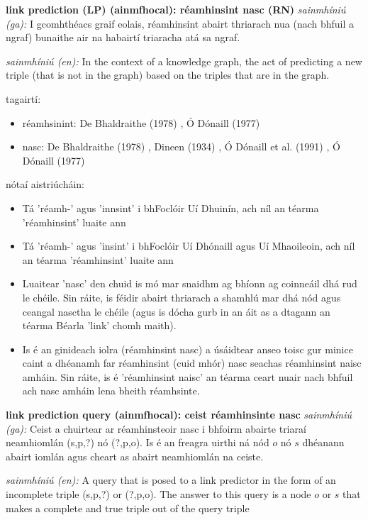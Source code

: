 \documentclass{article}
\begin{document}
\textbf{link prediction (LP) (ainmfhocal): réamhinsint nasc (RN)}
\textit{sainmhíniú (ga):} I gcomhthéacs graif eolais, réamhinsint abairt thriarach nua (nach bhfuil a ngraf) bunaithe air na habairtí triaracha atá sa ngraf.

\textit{sainmhíniú (en):} In the context of a knowledge graph, the act of predicting a new triple (that is not in the graph) based on the triples that are in the graph.

tagairtí:
\begin{itemize}
	\item réamhsinint: De Bhaldraithe (1978) \cite{de-bhaldraithe}, Ó Dónaill (1977) \cite{odonaill}
	\item nasc: De Bhaldraithe (1978) \cite{de-bhaldraithe}, Dineen (1934) \cite{dineen}, Ó Dónaill et al. (1991) \cite{focloir-beag}, Ó Dónaill (1977) \cite{odonaill}
\end{itemize}

nótaí aistriúcháin:
\begin{itemize}
	\item Tá 'réamh-' agus 'innsint' i bhFoclóir Uí Dhuinín, ach níl an téarma 'réamhinsint' luaite ann
	\item Tá 'réamh-' agus 'insint' i bhFoclóir Uí Dhónaill agus Uí Mhaoileoin, ach níl an téarma 'réamhinsint' luaite ann
	\item Luaitear 'nasc' den chuid is mó mar snaidhm ag bhíonn ag coinneáil dhá rud le chéile. Sin ráite, is féidir abairt thriarach a shamhlú mar dhá nód agus ceangal nasctha le chéile (agus is dócha gurb in an áit as a dtagann an téarma Béarla 'link' chomh maith).
	\item Is é an ginideach iolra (réamhinsint nasc) a úsáidtear anseo toisc gur minice caint a dhéanamh far réamhinsint (cuid mhór) nasc seachas réamhinsint naisc amháin. Sin ráite, is é 'réamhinsint naisc' an téarma ceart nuair nach bhfuil ach nasc amháin lena bheith réamhsinte.
\end{itemize}


\textbf{link prediction query (ainmfhocal): ceist réamhinsinte nasc}
\textit{sainmhíniú (ga):} Ceist a chuirtear ar réamhinsteoir nasc i bhfoirm abairte triaraí neamhiomlán (s,p,?) nó (?,p,o). Is é an freagra uirthi ná nód $o$ nó $s$ dhéanann abairt iomlán agus cheart as abairt neamhiomlán na ceiste.

\textit{sainmhíniú (en):} A query that is posed to a link predictor in the form of an incomplete triple (s,p,?) or (?,p,o). The answer to this query is a node $o$ or $s$ that makes a complete and true triple out of the query triple
\end{document}
